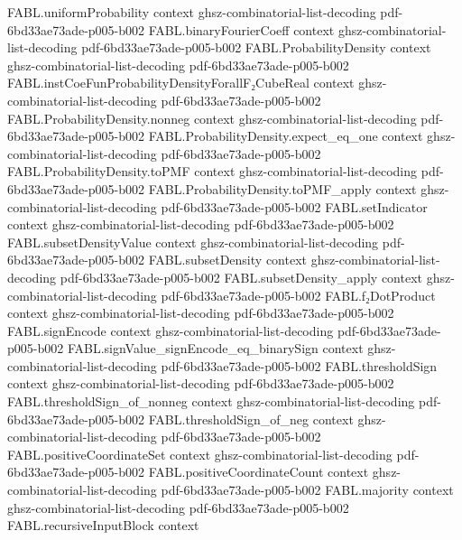 \begin{theorem}
\proofstep
  {FABL.uniformProbability}
  {context}
  {ghsz-combinatorial-list-decoding}
  {pdf-6bd33ae73ade-p005-b002}
\proofstep
  {FABL.binaryFourierCoeff}
  {context}
  {ghsz-combinatorial-list-decoding}
  {pdf-6bd33ae73ade-p005-b002}
\proofstep
  {FABL.ProbabilityDensity}
  {context}
  {ghsz-combinatorial-list-decoding}
  {pdf-6bd33ae73ade-p005-b002}
\proofstep
  {FABL.instCoeFunProbabilityDensityForallF₂CubeReal}
  {context}
  {ghsz-combinatorial-list-decoding}
  {pdf-6bd33ae73ade-p005-b002}
\proofstep
  {FABL.ProbabilityDensity.nonneg}
  {context}
  {ghsz-combinatorial-list-decoding}
  {pdf-6bd33ae73ade-p005-b002}
\proofstep
  {FABL.ProbabilityDensity.expect_eq_one}
  {context}
  {ghsz-combinatorial-list-decoding}
  {pdf-6bd33ae73ade-p005-b002}
\proofstep
  {FABL.ProbabilityDensity.toPMF}
  {context}
  {ghsz-combinatorial-list-decoding}
  {pdf-6bd33ae73ade-p005-b002}
\proofstep
  {FABL.ProbabilityDensity.toPMF_apply}
  {context}
  {ghsz-combinatorial-list-decoding}
  {pdf-6bd33ae73ade-p005-b002}
\proofstep
  {FABL.setIndicator}
  {context}
  {ghsz-combinatorial-list-decoding}
  {pdf-6bd33ae73ade-p005-b002}
\proofstep
  {FABL.subsetDensityValue}
  {context}
  {ghsz-combinatorial-list-decoding}
  {pdf-6bd33ae73ade-p005-b002}
\proofstep
  {FABL.subsetDensity}
  {context}
  {ghsz-combinatorial-list-decoding}
  {pdf-6bd33ae73ade-p005-b002}
\proofstep
  {FABL.subsetDensity_apply}
  {context}
  {ghsz-combinatorial-list-decoding}
  {pdf-6bd33ae73ade-p005-b002}
\proofstep
  {FABL.f₂DotProduct}
  {context}
  {ghsz-combinatorial-list-decoding}
  {pdf-6bd33ae73ade-p005-b002}
\proofstep
  {FABL.signEncode}
  {context}
  {ghsz-combinatorial-list-decoding}
  {pdf-6bd33ae73ade-p005-b002}
\proofstep
  {FABL.signValue_signEncode_eq_binarySign}
  {context}
  {ghsz-combinatorial-list-decoding}
  {pdf-6bd33ae73ade-p005-b002}
\proofstep
  {FABL.thresholdSign}
  {context}
  {ghsz-combinatorial-list-decoding}
  {pdf-6bd33ae73ade-p005-b002}
\proofstep
  {FABL.thresholdSign_of_nonneg}
  {context}
  {ghsz-combinatorial-list-decoding}
  {pdf-6bd33ae73ade-p005-b002}
\proofstep
  {FABL.thresholdSign_of_neg}
  {context}
  {ghsz-combinatorial-list-decoding}
  {pdf-6bd33ae73ade-p005-b002}
\proofstep
  {FABL.positiveCoordinateSet}
  {context}
  {ghsz-combinatorial-list-decoding}
  {pdf-6bd33ae73ade-p005-b002}
\proofstep
  {FABL.positiveCoordinateCount}
  {context}
  {ghsz-combinatorial-list-decoding}
  {pdf-6bd33ae73ade-p005-b002}
\proofstep
  {FABL.majority}
  {context}
  {ghsz-combinatorial-list-decoding}
  {pdf-6bd33ae73ade-p005-b002}
\proofstep
  {FABL.recursiveInputBlock}
  {context}

\end{theorem}
